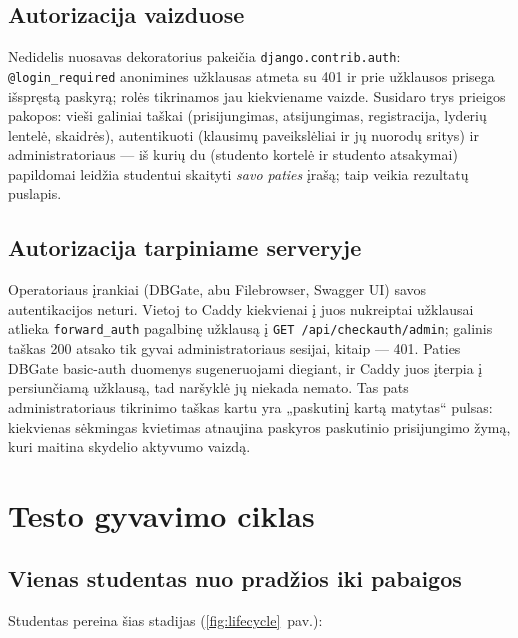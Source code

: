 \documentclass[11pt,a4paper]{article}
\newcommand{\code}[1]{\texttt{#1}}
\begin{document}
\subsection{Autorizacija vaizduose}

Nedidelis nuosavas dekoratorius pakeičia \code{django.contrib.auth}:
\code{@login\_required} anonimines užklausas atmeta su 401 ir prie
užklausos prisega išspręstą paskyrą; rolės tikrinamos jau kiekviename
vaizde. Susidaro trys prieigos pakopos: vieši galiniai taškai
(prisijungimas, atsijungimas, registracija, lyderių lentelė,
skaidrės),
autentikuoti (klausimų paveikslėliai ir jų nuorodų sritys) ir
administratoriaus — iš kurių du (studento kortelė ir studento
atsakymai) papildomai leidžia studentui skaityti \emph{savo paties}
įrašą; taip veikia rezultatų puslapis.

\subsection{Autorizacija tarpiniame serveryje}
\label{sec:gateway}

Operatoriaus įrankiai (DBGate, abu Filebrowser, Swagger UI) savos
autentikacijos neturi. Vietoj to Caddy kiekvienai į juos nukreiptai
užklausai atlieka \code{forward\_auth} pagalbinę užklausą į
\code{GET /api/checkauth/admin}; galinis taškas 200 atsako tik gyvai
administratoriaus sesijai, kitaip — 401. Paties DBGate basic-auth
duomenys sugeneruojami diegiant, ir Caddy juos įterpia į
persiunčiamą užklausą, tad naršyklė jų niekada nemato. Tas pats
administratoriaus tikrinimo taškas kartu yra „paskutinį kartą
matytas`` pulsas: kiekvienas sėkmingas kvietimas atnaujina paskyros
paskutinio prisijungimo žymą, kuri maitina skydelio aktyvumo vaizdą.

\section{Testo gyvavimo ciklas}
\label{sec:lifecycle}

\subsection{Vienas studentas nuo pradžios iki pabaigos}

Studentas pereina šias stadijas (\ref{fig:lifecycle}~pav.):
\end{document}
